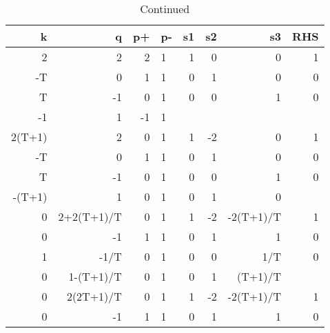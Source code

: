 \begin{table}[ht]
    \ContinuedFloat
    \caption{Continued}

    \begin{tabular}{rrrlrrrr}
        k      & q          & p+ & p- & s1        & s2         & s3          & RHS       \\ \hline
        2      & 2          & 2  & 1  & 1         & 0          & 0           & 1         \\
        -T     & 0          & 1  & 1  & 0         & 1          & 0           & 0         \\
        T      & -1         & 0  & 1  & 0         & 0          & 1           & 0         \\
        -1     & 1          & -1 & 1  &           &            &             &           \\ \hline
        2(T+1) & 2          & 0  & 1  & 1         & -2         & 0           & 1         \\ \hline
        -T     & 0          & 1  & 1  & 0         & 1          & 0           & 0         \\
        T      & -1         & 0  & 1  & 0         & 0          & 1           & 0         \\
        -(T+1) & 1          & 0  & 1  & 0         & 1          & 0           &           \\ \hline
        0      & 2+2(T+1)/T & 0  & 1  & 1         & -2         & -2(T+1)/T   & 1         \\ \hline
        0      & -1         & 1  & 1  & 0         & 1          & 1           & 0         \\
        1      & -1/T       & 0  & 1  & 0         & 0          & 1/T         & 0         \\
        0      & 1-(T+1)/T  & 0  & 1  & 0         & 1          & (T+1)/T     &           \\ \hline
        0      & 2(2T+1)/T  & 0  & 1  & 1         & -2         & -2(T+1)/T   & 1         \\ \hline
        0      & -1         & 1  & 1  & 0         & 1          & 1           & 0         \\

\end{tabular}
\end{table}
